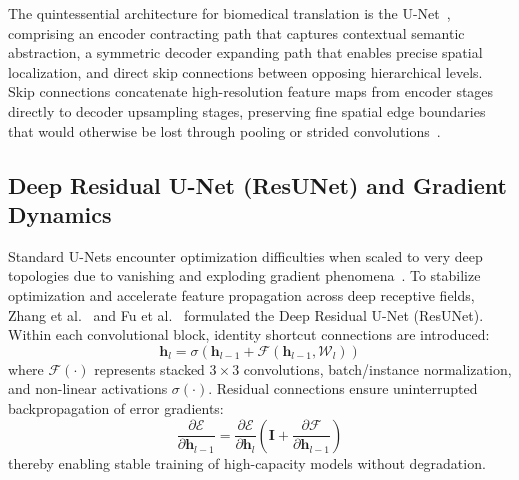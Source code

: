 The quintessential architecture for biomedical translation is the U-Net~\cite{ronneberger2015u}, comprising an encoder contracting path that captures contextual semantic abstraction, a symmetric decoder expanding path that enables precise spatial localization, and direct skip connections between opposing hierarchical levels. Skip connections concatenate high-resolution feature maps from encoder stages directly to decoder upsampling stages, preserving fine spatial edge boundaries that would otherwise be lost through pooling or strided convolutions~\cite{ronneberger2015u,dinkla2018mr}.

\subsection{Deep Residual U-Net (ResUNet) and Gradient Dynamics}
Standard U-Nets encounter optimization difficulties when scaled to very deep topologies due to vanishing and exploding gradient phenomena~\cite{he2016deep}. To stabilize optimization and accelerate feature propagation across deep receptive fields, Zhang et al.~\cite{zhang2018road} and Fu et al.~\cite{fu2019fast} formulated the Deep Residual U-Net (ResUNet). Within each convolutional block, identity shortcut connections are introduced:
\begin{equation}
\mathbf{h}_{l} = \sigma\left( \mathbf{h}_{l-1} + \mathcal{F}(\mathbf{h}_{l-1}, \mathcal{W}_l) \right)
\label{eq:residual_block}
\end{equation}
where $\mathcal{F}(\cdot)$ represents stacked $3\times3$ convolutions, batch/instance normalization, and non-linear activations $\sigma(\cdot)$. Residual connections ensure uninterrupted backpropagation of error gradients:
\begin{equation}
\frac{\partial \mathcal{E}}{\partial \mathbf{h}_{l-1}} = \frac{\partial \mathcal{E}}{\partial \mathbf{h}_{l}} \left( \mathbf{I} + \frac{\partial \mathcal{F}}{\partial \mathbf{h}_{l-1}} \right)
\label{eq:res_gradient}
\end{equation}
thereby enabling stable training of high-capacity models without degradation.

